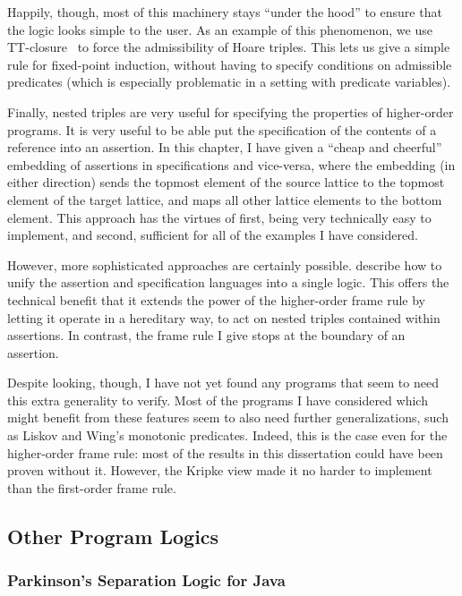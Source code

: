 Happily, though, most of this machinery stays ``under the hood'' to
ensure that the logic looks simple to the user.  As an example of this
phenomenon, we use TT-closure~\cite{tt-closure} to force the
admissibility of Hoare triples. This lets us give a simple rule for
fixed-point induction, without having to specify conditions on
admissible predicates (which is especially problematic in a setting
with predicate variables).

Finally, nested triples are very useful for specifying the properties
of higher-order programs. It is very useful to be able put the
specification of the contents of a reference into an assertion.  In
this chapter, I have given a ``cheap and cheerful'' embedding of
assertions in specifications and vice-versa, where the embedding (in
either direction) sends the topmost element of the source lattice to
the topmost element of the target lattice, and maps all other lattice
elements to the bottom element. This approach has the virtues of
first, being very technically easy to implement, and second,
sufficient for all of the examples I have considered.

However, more sophisticated approaches are certainly
possible. \citet{nested-hoare-triples} describe how to unify the
assertion and specification languages into a single logic.  This
offers the technical benefit that it extends the power of the
higher-order frame rule by letting it operate in a hereditary way, to
act on nested triples contained within assertions. In contrast, the
frame rule I give stops at the boundary of an assertion. 

Despite looking, though, I have not yet found any programs that seem
to need this extra generality to verify. Most of the programs I have
considered which might benefit from these features seem to also need
further generalizations, such as Liskov and Wing's monotonic
predicates. Indeed, this is the case even for the higher-order frame
rule: most of the results in this dissertation could have been proven
without it. However, the Kripke view made it no harder to implement
than the first-order frame rule. 


\subsection{Other Program Logics}

\subsubsection{Parkinson's Separation Logic for Java}

